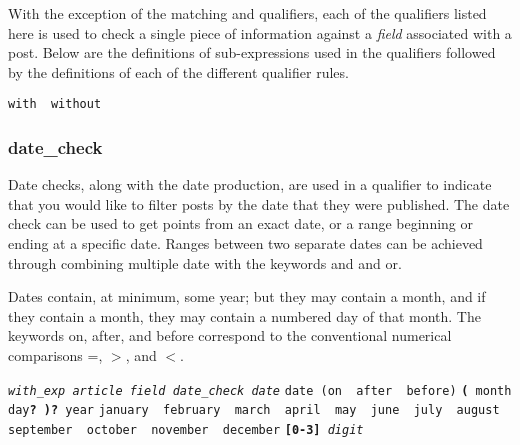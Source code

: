 With the exception of the matching and  qualifiers, each of the qualifiers listed here is used to check a single piece of
information against a \textit{field} associated with a post. Below are the definitions of sub-expressions used in the qualifiers followed
by the definitions of each of the different  qualifier rules.
\begin{description}[labelindent=1cm,leftmargin=\onelen,labelwidth=1cm]
     \texttt{with \textbf{\textbar} without}
\end{description}

\subsubsection{date\_check}
Date checks, along with the date production, are used in a qualifier to indicate that you would like to filter posts by the date that
they were published. The date check can be used to get points from an exact date, or a range beginning or ending at a specific date.
Ranges between two separate dates can be achieved through combining multiple date  with the keywords and and or.

Dates contain, at minimum, some year; but they may contain a month, and if they contain a month, they may contain a numbered day of
that month. The keywords on, after, and before correspond to the conventional numerical comparisons =, $>$, and $<$.
\begin{description}[labelindent=1cm,leftmargin=\onelen,labelwidth=1cm]
      \texttt{\textit{with\_exp article field date\_check date}}
      \texttt{date (on \textbf{\textbar} after \textbf{\textbar} before)}
      \texttt{\textbf{(} month day\textbf{?} \textbf{)?} year}
      
     \texttt{january \textbf{\textbar} february \textbf{\textbar} march \textbf{\textbar} april \textbf{\textbar} may \textbf{\textbar} june \textbf{\textbar} july \textbf{\textbar} august \textbf{\textbar} september \textbf{\textbar} october \textbf{\textbar} november \textbf{\textbar} december}
     \texttt{\textbf{[0-3]} \textit{digit}}
\end{description}

